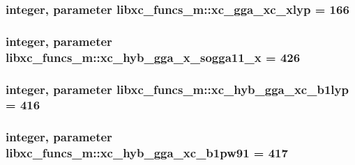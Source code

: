 \hypertarget{classlibxc__funcs__m_a03e9eb4cc28a13a2d4903c811a4ebd84}{
\subsubsection[{xc\-\_\-gga\-\_\-xc\-\_\-xlyp}]{\setlength{\rightskip}{0pt plus 5cm}integer, parameter libxc\-\_\-funcs\-\_\-m\-::xc\-\_\-gga\-\_\-xc\-\_\-xlyp = 166}}\label{classlibxc__funcs__m_a03e9eb4cc28a13a2d4903c811a4ebd84}
\hypertarget{classlibxc__funcs__m_af01fbfae1518a5b3a46dfa78400cf033}{
\subsubsection[{xc\-\_\-hyb\-\_\-gga\-\_\-x\-\_\-sogga11\-\_\-x}]{\setlength{\rightskip}{0pt plus 5cm}integer, parameter libxc\-\_\-funcs\-\_\-m\-::xc\-\_\-hyb\-\_\-gga\-\_\-x\-\_\-sogga11\-\_\-x = 426}}\label{classlibxc__funcs__m_af01fbfae1518a5b3a46dfa78400cf033}
\hypertarget{classlibxc__funcs__m_a1fccd3ef40f9d11885fadfb4e11ef55a}{
\subsubsection[{xc\-\_\-hyb\-\_\-gga\-\_\-xc\-\_\-b1lyp}]{\setlength{\rightskip}{0pt plus 5cm}integer, parameter libxc\-\_\-funcs\-\_\-m\-::xc\-\_\-hyb\-\_\-gga\-\_\-xc\-\_\-b1lyp = 416}}\label{classlibxc__funcs__m_a1fccd3ef40f9d11885fadfb4e11ef55a}
\hypertarget{classlibxc__funcs__m_acf4b49ffc62cdc8af7d7a31e52b80ba8}{
\subsubsection[{xc\-\_\-hyb\-\_\-gga\-\_\-xc\-\_\-b1pw91}]{\setlength{\rightskip}{0pt plus 5cm}integer, parameter libxc\-\_\-funcs\-\_\-m\-::xc\-\_\-hyb\-\_\-gga\-\_\-xc\-\_\-b1pw91 = 417}}\label{classlibxc__funcs__m_acf4b49ffc62cdc8af7d7a31e52b80ba8}

